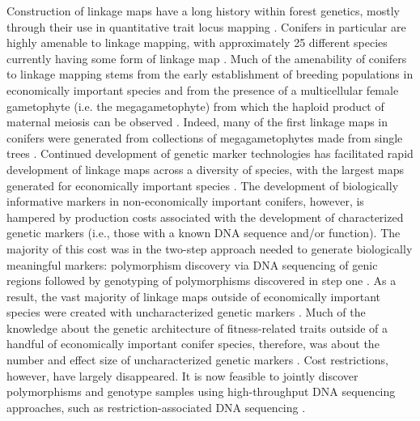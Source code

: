 \documentclass[11pt]{article}
\begin{document}
Construction of linkage maps have a long history within forest genetics, mostly through their use in quantitative trait locus mapping \citep{Ritland:2011}. 
Conifers in particular are highly amenable to linkage mapping, with approximately 25 different species currently having some 
form of linkage map \citep[see Table 5-1 in][]{Ritland:2011}. Much of the amenability of conifers to linkage mapping stems from 
the early establishment of breeding populations in economically important species and from the presence of a multicellular 
female gametophyte (i.e. the megagametophyte) from which the haploid product of maternal meiosis can be observed \citep{Cairney:2007}. Indeed, many of the first linkage maps in conifers were generated from collections of 
megagametophytes made from single trees \citep{Tulsieram:1992, Nelson:1993, Kubisiak:1996}. Continued development 
of genetic marker technologies has facilitated rapid development of linkage maps across a diversity of species, with the largest maps 
generated for economically important species \citep[e.g.][] {Achere:2004, Kang:2010, Martinez-Garcia:2013}. 
The development of biologically informative markers in non-economically important conifers, however, is hampered by production costs associated
with the development of characterized  genetic markers (i.e., those with a known DNA sequence and/or function). 
The majority of this cost was in the two-step approach needed to generate biologically 
meaningful markers: polymorphism discovery via DNA sequencing of genic regions followed by genotyping of polymorphisms 
discovered in step one \citep[cf.][]{Eckert:2013a}. As a result, the vast majority of linkage maps outside of economically important 
species were created with uncharacterized genetic markers \citep[e.g.][]{Travis:1998}. Much of the knowledge about the genetic 
architecture of fitness-related traits outside of a handful of economically important conifer species, therefore, was about the 
number and effect size of uncharacterized genetic markers \citep{Ritland:2011}. Cost restrictions, however, have largely disappeared. 
It is now feasible to jointly discover polymorphisms and genotype samples using high-throughput DNA sequencing 
approaches, such as restriction-associated DNA sequencing \citep [RADseq; e.g.][] {Peterson:2012}. 
\end{document}
